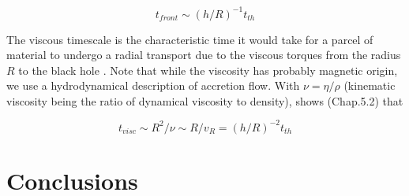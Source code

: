 \documentclass[twocolumn]{aastex62}
\begin{document}
\begin{equation}
t_{front} \sim (h/R) ^ {-1} t_{th}
\end{equation}


The viscous timescale is the characteristic time it would take for a parcel of material to undergo a radial transport due to the viscous torques from the radius $R$ to the black hole \citep{czerny2006}. Note that while the viscosity has probably magnetic origin\citep{eardley1975, grzedzielski2017}, we use a hydrodynamical description of accretion flow.  With $\nu = \eta / \rho$ (kinematic viscosity being the ratio of dynamical viscosity to density), \cite{frank2002} shows (Chap.5.2) that 

\begin{equation}
t_{visc} \sim R^{2} / \nu \sim  R / v_{R} = (h/R)^{-2} t_{th}
\end{equation}





%
%
%
%
%
%

\section{Conclusions}





 


\end{document}
